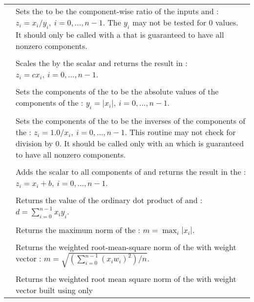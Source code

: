 \begin{xtabular}{|p{\colone}|p{\coltwo}|}
& Sets the   to be the component-wise ratio of the
 inputs  and :
$z_i = x_i / y_i,\: i=0,\ldots,n-1$. The $y_i$ may not be tested
for $0$ values. It should only be called with a  that is
guaranteed to have all nonzero components.
\\[2mm]
 &  \\
& Scales the   by the  scalar 
and returns the result in :
$z_i = c x_i , \: i=0,\ldots,n-1$.
\\[2mm]
 &  \\
& Sets the components of the   to be the absolute
values of the components of the  :
$y_i = | x_i | , \: i=0,\ldots,n-1$.
\\[2mm]
 &  \\
& Sets the components of the   to be the inverses
of the components of the  :
$z_i = 1.0 /  x_i  , \: i=0,\ldots,n-1$. This routine
may not check for division by $0$. It should be called only with an
 which is guaranteed to have all nonzero components.
\\[2mm]
 &  \\
& Adds the  scalar  to all components of 
and returns the result in the  :
$z_i = x_i + b , \: i=0,\ldots,n-1$.
\\[2mm]
 &  \\
& Returns the value of the ordinary dot product of  and :
$d=\sum_{i=0}^{n-1} x_i y_i$.
\\[2mm]
 &  \\
& Returns the maximum norm of the  :
$m = \max_{i} | x_i |$.
\\[2mm]
 &  \\
& Returns the weighted root-mean-square norm of the   with
 weight vector :
$m = \sqrt{\left( \sum_{i=0}^{n-1} (x_i w_i)^2 \right) / n}$.
\\[2mm]
 &  \\
& Returns the weighted root mean square norm of the   with
 weight vector  built using only

\end{xtabular}
